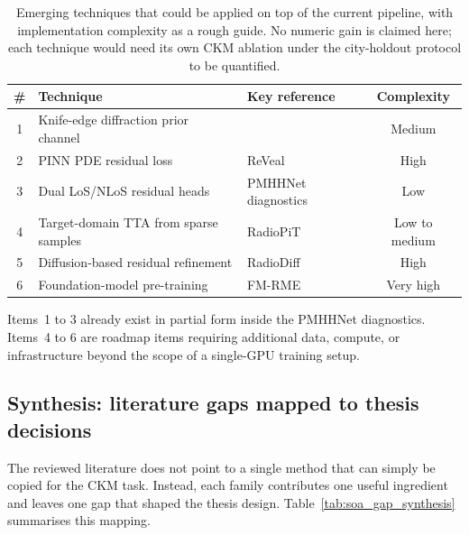 \begin{table}[ht]
\centering
\caption[Emerging techniques for future CKM work.]%
{Emerging techniques that could be applied on top of the current
pipeline, with implementation complexity as a rough guide. No numeric gain is
claimed here; each technique would need its own CKM ablation under the
city-holdout protocol to be quantified.}
\label{tab:emerging}
\begin{tabularx}{\textwidth}{clXc}
\toprule
\textbf{\#} & \textbf{Technique} & \textbf{Key reference} & \textbf{Complexity} \\
\midrule
1 & Knife-edge diffraction prior channel & \cite{geomDL2024} & Medium \\
2 & PINN PDE residual loss & ReVeal \cite{reveal2025} & High \\
3 & Dual LoS/NLoS residual heads & PMHHNet diagnostics & Low \\
4 & Target-domain TTA from sparse samples & RadioPiT \cite{radiopit2025} & Low to medium \\
5 & Diffusion-based residual refinement & RadioDiff \cite{radiodiff2025} & High \\
6 & Foundation-model pre-training & FM-RME \cite{fmrme2026} & Very high \\
\bottomrule
\end{tabularx}
\end{table}

Items~1 to 3 already exist in partial form inside the PMHHNet diagnostics. Items~4 to 6
are roadmap items requiring additional data, compute, or infrastructure beyond
the scope of a single-GPU training setup.

\subsection{Synthesis: literature gaps mapped to thesis decisions}

The reviewed literature does not point to a single method that can simply be
copied for the CKM task. Instead, each family contributes one useful ingredient
and leaves one gap that shaped the thesis design. Table~\ref{tab:soa_gap_synthesis}
summarises this mapping.

